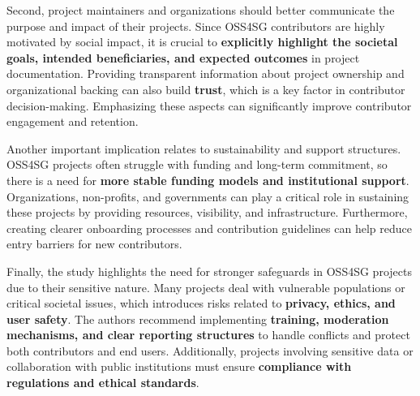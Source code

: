 Second, project maintainers and organizations should better communicate the purpose and impact of their projects. Since OSS4SG contributors are highly motivated by social impact, it is crucial to \textbf{explicitly highlight the societal goals, intended beneficiaries, and expected outcomes} in project documentation. Providing transparent information about project ownership and organizational backing can also build \textbf{trust}, which is a key factor in contributor decision-making. Emphasizing these aspects can significantly improve contributor engagement and retention.

Another important implication relates to sustainability and support structures. OSS4SG projects often struggle with funding and long-term commitment, so there is a need for \textbf{more stable funding models and institutional support}. Organizations, non-profits, and governments can play a critical role in sustaining these projects by providing resources, visibility, and infrastructure. Furthermore, creating clearer onboarding processes and contribution guidelines can help reduce entry barriers for new contributors.

Finally, the study highlights the need for stronger safeguards in OSS4SG projects due to their sensitive nature. Many projects deal with vulnerable populations or critical societal issues, which introduces risks related to \textbf{privacy, ethics, and user safety}. The authors recommend implementing \textbf{training, moderation mechanisms, and clear reporting structures} to handle conflicts and protect both contributors and end users. Additionally, projects involving sensitive data or collaboration with public institutions must ensure \textbf{compliance with regulations and ethical standards}.
